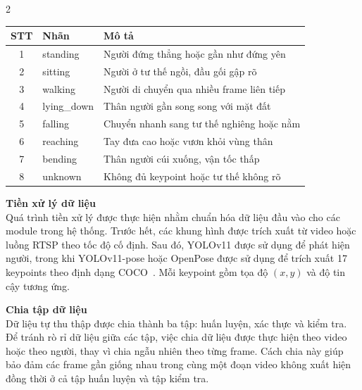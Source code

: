 \documentclass[a4paper, twoside, 12pt]{article}
\begin{document}
\begin{multicols}{2}
\vspace{0.2cm}
\begin{center}
\label{tab:cpose_adl_classes}
\renewcommand{\arraystretch}{1.2}
\scriptsize
\begin{tabular}{|c|p{2.2cm}|p{4.5cm}|}
\hline
\textbf{STT} & \textbf{Nhãn} & \textbf{Mô tả} \\
\hline
1 & standing & Người đứng thẳng hoặc gần như đứng yên \\
\hline
2 & sitting & Người ở tư thế ngồi, đầu gối gập rõ \\
\hline
3 & walking & Người di chuyển qua nhiều frame liên tiếp \\
\hline
4 & lying\_down & Thân người gần song song với mặt đất \\
\hline
5 & falling & Chuyển nhanh sang tư thế nghiêng hoặc nằm \\
\hline
6 & reaching & Tay đưa cao hoặc vươn khỏi vùng thân \\
\hline
7 & bending & Thân người cúi xuống, vận tốc thấp \\
\hline
8 & unknown & Không đủ keypoint hoặc tư thế không rõ \\
\hline
\end{tabular}
\end{center}

\vspace{0.1cm}
\hspace*{0.5cm}\textbf{Tiền xử lý dữ liệu}\\
Quá trình tiền xử lý được thực hiện nhằm chuẩn hóa dữ liệu đầu vào cho các module trong hệ thống. Trước hết, các khung hình được trích xuất từ video hoặc luồng RTSP theo tốc độ cố định. Sau đó, YOLOv11 được sử dụng để phát hiện người, trong khi YOLOv11-pose hoặc OpenPose được sử dụng để trích xuất 17 keypoints theo định dạng COCO~\cite{yolov11,cao2017openpose}. Mỗi keypoint gồm tọa độ $(x,y)$ và độ tin cậy tương ứng.



\vspace{0.1cm}
\hspace*{0.5cm}\textbf{Chia tập dữ liệu}\\
Dữ liệu tự thu thập được chia thành ba tập: huấn luyện, xác thực và kiểm tra. Để tránh rò rỉ dữ liệu giữa các tập, việc chia dữ liệu được thực hiện theo video hoặc theo người, thay vì chia ngẫu nhiên theo từng frame. Cách chia này giúp bảo đảm các frame gần giống nhau trong cùng một đoạn video không xuất hiện đồng thời ở cả tập huấn luyện và tập kiểm tra.


\end{multicols}
\end{document}
